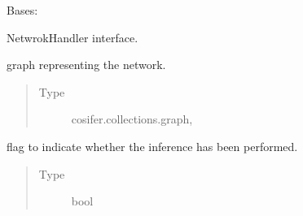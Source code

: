 \documentclass[letterpaper,10pt,english]{sphinxmanual}
\begin{document}
\begin{fulllineitems}
\label{\detokenize{_modules/cosifer.handlers:cosifer.handlers.network_handler.NetworkHandler}}
Bases: {\hyperref[\detokenize{_modules/cosifer.handlers:cosifer.handlers.fs_handler.FileSystemHandler}]{}}

NetwrokHandler interface.

\begin{fulllineitems}
\label{\detokenize{_modules/cosifer.handlers:cosifer.handlers.network_handler.NetworkHandler.graph}}
graph representing the
network.
\begin{quote}\begin{description}
\item[{Type}] \leavevmode
cosifer.collections.graph,{\hyperref[\detokenize{_modules/cosifer.collections:cosifer.collections.graph.Graph}]{}}

\end{description}\end{quote}

\end{fulllineitems}


\begin{fulllineitems}
\label{\detokenize{_modules/cosifer.handlers:cosifer.handlers.network_handler.NetworkHandler.trained}}
flag to indicate whether the inference has been
performed.
\begin{quote}\begin{description}
\item[{Type}] \leavevmode
bool

\end{description}\end{quote}

\end{fulllineitems}


\end{fulllineitems}
\end{document}
